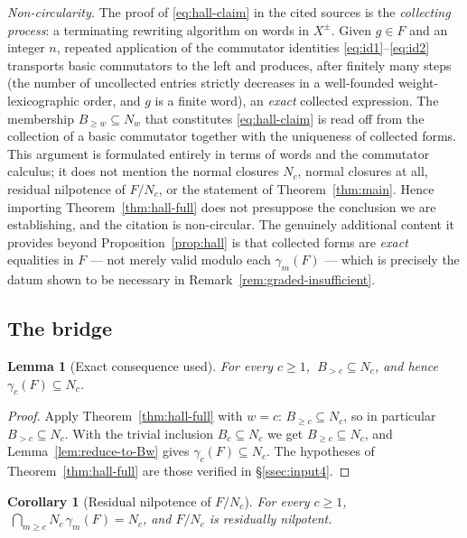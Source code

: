 \documentclass{amsart}
\newtheorem{lemma}{Lemma}
\newtheorem{corollary}{Corollary}
\theoremstyle{definition}
\theoremstyle{remark}
\begin{document}
\smallskip
\emph{Non-circularity.} The proof of \eqref{eq:hall-claim} in the cited sources is
the \emph{collecting process}: a terminating rewriting algorithm on words in
$X^{\pm}$. Given $g\in F$ and an integer $n$, repeated application of the commutator
identities \eqref{eq:id1}--\eqref{eq:id2} transports basic commutators to the left
and produces, after finitely many steps (the number of uncollected entries strictly
decreases in a well-founded weight-lexicographic order, and $g$ is a finite word),
an \emph{exact} collected expression. The membership $B_{\ge w}\subseteq N_w$ that
constitutes \eqref{eq:hall-claim} is read off from the collection of a basic
commutator together with the uniqueness of collected forms. This argument is
formulated entirely in terms of words and the commutator calculus; it does not
mention the normal closures $N_c$, normal closures at all, residual nilpotence of
$F/N_c$, or the statement of Theorem~\ref{thm:main}. Hence importing
Theorem~\ref{thm:hall-full} does not presuppose the conclusion we are establishing,
and the citation is non-circular. The genuinely additional content it provides
beyond Proposition~\ref{prop:hall} is that collected forms are \emph{exact}
equalities in $F$ --- not merely valid modulo each $\gamma_m(F)$ --- which is
precisely the datum shown to be necessary in Remark~\ref{rem:graded-insufficient}.

\subsection{The bridge}\label{ssec:bridge}

\begin{lemma}[Exact consequence used]\label{lem:hall-residual}
For every $c\ge1$, $\ B_{>c}\subseteq N_c$, and hence $\gamma_c(F)\subseteq N_c$.
\end{lemma}

\begin{proof}
Apply Theorem~\ref{thm:hall-full} with $w=c$: $B_{\ge c}\subseteq N_c$, so in
particular $B_{>c}\subseteq N_c$. With the trivial inclusion $B_c\subseteq N_c$ we
get $B_{\ge c}\subseteq N_c$, and Lemma~\ref{lem:reduce-to-Bw} gives
$\gamma_c(F)\subseteq N_c$. The hypotheses of Theorem~\ref{thm:hall-full} are those
verified in \S\ref{ssec:input4}.
\end{proof}

\begin{corollary}[Residual nilpotence of $F/N_c$]\label{cor:resnil}
For every $c\ge1$, $\ \bigcap_{m\ge c}N_c\,\gamma_m(F)=N_c$, and $F/N_c$ is
residually nilpotent.
\end{corollary}
\end{document}
